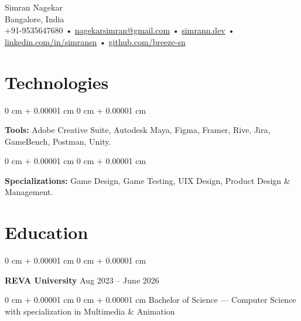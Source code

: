 \documentclass[10pt, letterpaper]{article}
\newenvironment{onecolentry}{
    \begin{adjustwidth}{
        0 cm + 0.00001 cm
    }{
        0 cm + 0.00001 cm
    }
}{
    \end{adjustwidth}
} %
\newenvironment{twocolentry}[2][]{
    \onecolentry
    \def\secondColumn{#2}
    \setcolumnwidth{\fill, 4.5 cm}
    \begin{paracol}{2}
}{
    \switchcolumn \raggedleft \secondColumn
    \end{paracol}
    \endonecolentry
} %
\newenvironment{header}{
    \setlength{\topsep}{0pt}\par\kern\topsep\raggedright\linespread{1.5}
}{
    \par\kern\topsep
} %
\begin{document}
    \newcommand{\AND}{\unskip
        \cleaders\copy\ANDbox\hskip\wd\ANDbox
        \ignorespaces
    }
    \newsavebox\ANDbox
    \sbox\ANDbox{$|$}

    \begin{header}
    {\color{secondaryColor} \fontsize{25pt}{25pt}\selectfont Simran Nagekar}\\
    \vspace{1pt}
    Bangalore, India\\
    \vspace{2pt}
     \color{secondaryColor}  +91-9535647680 • \href{mailto:nagekarsimran@gmail.com}{\color{secondaryColor}nagekarsimran@gmail.com} • \href{https://simrann.dev/}{\color{secondaryColor}simrann.dev} •
    \href{https://linkedin.com/in/simransn}{\color{secondaryColor}linkedin.com/in/simransn} •
    \href{https://github.com/breeze-sn}{\color{secondaryColor}github.com/breeze-sn}  
\end{header}

    \vspace{5 pt - 0.3 cm}

     
    \section{\color{secondaryColor}Technologies}


        \vspace{0.1 cm}

        \begin{onecolentry}
            \textbf{Tools:} Adobe Creative Suite, Autodesk Maya, Figma, Framer, Rive, Jira, GameBench, Postman, Unity.
        \end{onecolentry}

        \vspace{0.1 cm}

        \begin{onecolentry}
            \textbf{Specializations:} Game Design, Game Testing, UIX Design, Product Design \& Management.
        \end{onecolentry}


    \section{\color{secondaryColor}Education} 
        \begin{twocolentry}{
            Aug 2023 – June 2026
        }
            \textbf{REVA University}\end{twocolentry}
            \begin{onecolentry} Bachelor of Science — Computer Science with specialization in Multimedia \& Animation \end{onecolentry}
\end{document}
